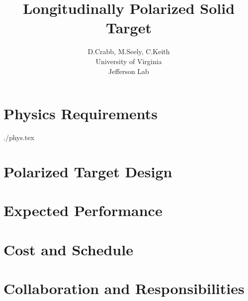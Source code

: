 \documentclass[12pt]{article}
\def\tex{.}
\begin{document}
\title{Longitudinally Polarized Solid Target}

\author{D.Crabb, M.Seely, C.Keith \\ [0.5ex]
University of Virginia\\
Jefferson Lab}



\maketitle


\vfil
\eject

\tableofcontents

\vfil
\eject

\renewcommand{\headrulewidth}{0pt}
\renewcommand{\footrulewidth}{0pt}
\pagestyle{myheading}
\section{Physics Requirements}
 {\tex/phys.tex}

\vfil
\eject

\section{Polarized Target Design}

\vfil
\eject


\section{Expected Performance}

\vfil
\eject

\section{Cost and Schedule}

\vfil
\eject
\clearpage 

\section{Collaboration and Responsibilities}

\end{document}
